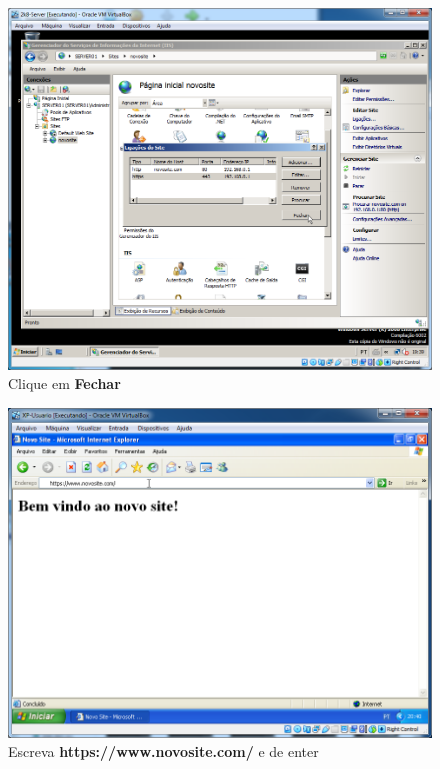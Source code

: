 \documentclass[10pt]{article}
\begin{document}
\begin{figure}[H]
    \centering
    \caption{Clique em \textbf{Fechar}}
    \label{fig:5532051}
    \includegraphics[width=\linewidth]{images/IIS/criando_um_novo_site/051.png}
\end{figure}
\begin{figure}[H]
    \centering
    \caption{Escreva \textbf{https://www.novosite.com/} e de enter}
    \label{fig:5532052}
    \includegraphics[width=\linewidth]{images/IIS/criando_um_novo_site/052.png}
\end{figure}
\end{document}
